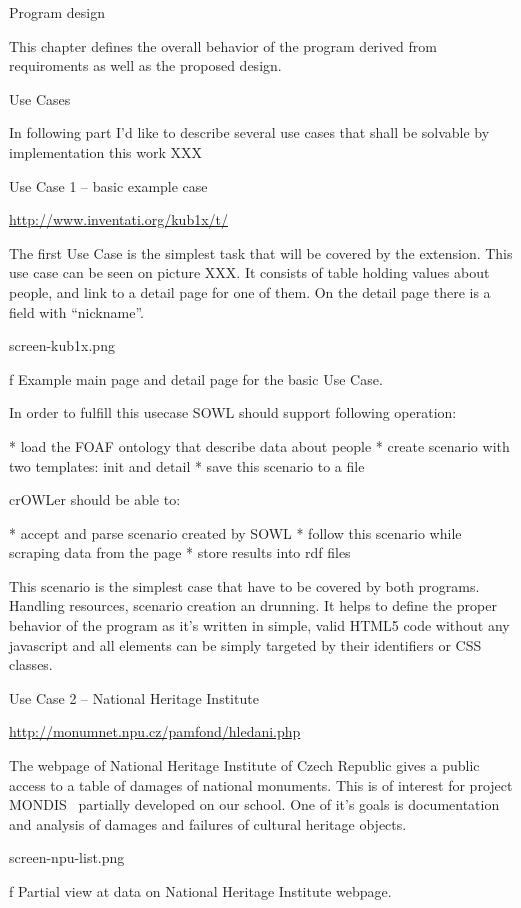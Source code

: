 \chap Program design

This chapter defines the overall behavior of the program derived from
requiroments as well as the proposed design. 

\sec Use Cases

In following part I'd like to describe several use cases that shall be
solvable by implementation this work XXX


\secc Use Case 1 -- basic example case

\url{http://www.inventati.org/kub1x/t/}

The first Use Case is the simplest task that will be covered by the extension.
This use case can be seen on picture XXX. It consists of table holding values
about people, and link to a detail page for one of them. On the detail page
there is a field with ``nickname''. 

\midinsert
\picw=12cm \cinspic screen-kub1x.png
\caption/f Example main page and detail page for the basic Use Case. 
\endinsert

In order to fulfill this usecase SOWL should support following operation: 

\begitems
  * load the FOAF ontology that describe data about people
  * create scenario with two templates: init and detail
  * save this scenario to a file
\enditems

crOWLer should be able to: 

\begitems
  * accept and parse scenario created by SOWL
  * follow this scenario while scraping data from the page
  * store results into rdf files
\enditems

This scenario is the simplest case that have to be covered by both programs.
Handling resources, scenario creation an drunning. It helps to define the
proper behavior of the program as it's written in simple, valid HTML5 code
without any javascript and all elements can be simply targeted by their
identifiers or CSS classes. 


\secc Use Case 2 -- National Heritage Institute

\url{http://monumnet.npu.cz/pamfond/hledani.php}

The webpage of National Heritage Institute of Czech Republic gives a public
access to a table of damages of national monuments. This is of interest for
project MONDIS~ partially developed on our school.
One of it's goals is documentation and analysis of damages and failures of
cultural heritage objects.

\midinsert
\picw=12cm \cinspic screen-npu-list.png
\caption/f Partial view at data on National Heritage Institute webpage. 
\endinsert

